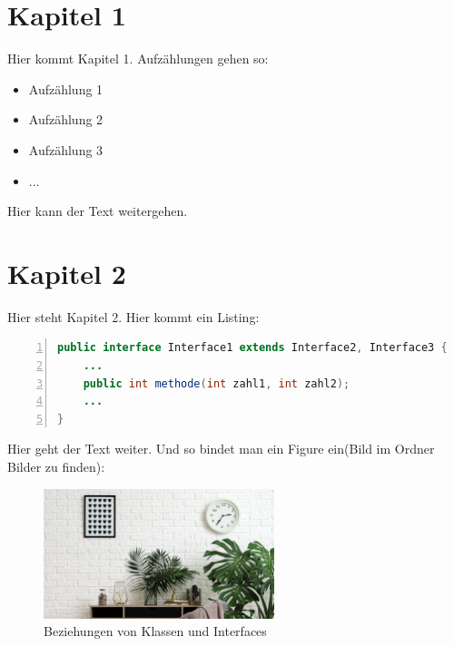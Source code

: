 \documentclass[fontsize=12pt,paper=a4,open=any,parskip=half,
  twoside=false,toc=listof,toc=bibliography,fleqn,leqno,
  captions=nooneline,captions=tableabove,british]{scrbook}
\begin{document}
\chapter{Kapitel 1}\label{ch:j.u}
Hier kommt Kapitel 1. Aufzählungen gehen so:
\begin{itemize}
 \item Aufzählung 1
 \item Aufzählung 2
 \item Aufzählung 3
 \item ...
\end{itemize}
Hier kann der Text weitergehen.

\chapter{Kapitel 2}\label{ch:interfaces}
Hier steht Kapitel 2. Hier kommt ein Listing:
\begin{lstlisting}[language=Java,
					caption={Deklaration eines Interfaces},
					backgroundcolor = \color{lightgray},
					captionpos=b,
					numbers=left,
					keywordstyle=\color{RoyalBlue},
    				rulecolor=\color{black},
   		 			upquote=true, 
					showstringspaces=false,
    				breaklines=true,
    				frame=single,
					aboveskip=2em,
					label={interface-deklaration},
]
public interface Interface1 extends Interface2, Interface3 {
	...
	public int methode(int zahl1, int zahl2);
	...
}
\end{lstlisting}
\captionsetup{justification=centering,margin=2cm}

Hier geht der Text weiter. Und so bindet man ein Figure ein(Bild im Ordner Bilder zu finden):


\begin{figure}[htbp]
 \centering
 \includegraphics[width=0.6\textwidth]{Bilder/bildname}
 \captionsetup{justification=centering,margin=2cm}
 \caption{Beziehungen von Klassen und Interfaces \autocite{jtpinterface}}
 \label{interface-relation}
\end{figure}
\end{document}
